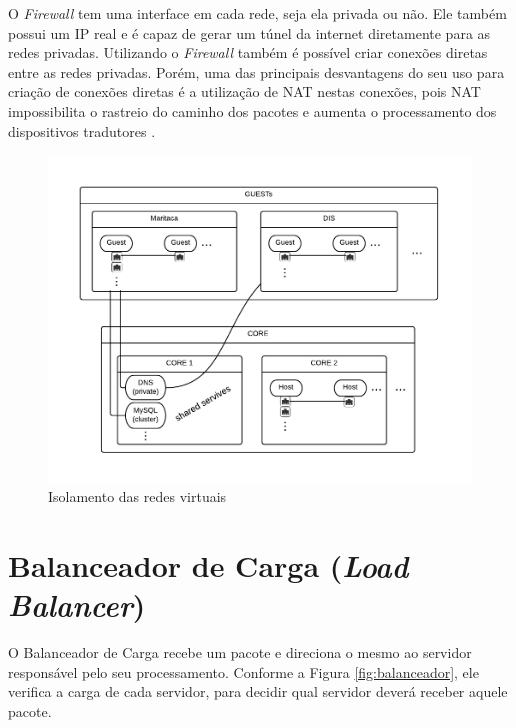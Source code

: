 O \textit{Firewall} tem uma interface em cada rede, seja ela privada ou não. Ele também possui um IP real e é capaz de gerar um túnel da internet diretamente para as redes privadas. Utilizando o \textit{Firewall} também é possível criar conexões diretas entre as redes privadas. Porém, uma das principais desvantagens do seu uso para criação de conexões diretas é a utilização de NAT nestas conexões, pois NAT impossibilita o rastreio do caminho dos pacotes e aumenta o processamento dos dispositivos tradutores \cite{mattos}. 

    \begin{figure}[htb]
    \centering
    \includegraphics[scale=0.50]{imagens/esquema2.pdf}
    \caption{Isolamento das redes virtuais}
    \label{fig:isolamento}
    \end{figure}
    
\section{Balanceador de Carga (\textit{Load Balancer})}

O Balanceador de Carga recebe um pacote e direciona o mesmo ao servidor responsável pelo seu processamento.
Conforme a Figura \ref{fig:balanceador}, ele verifica a carga de cada servidor, para decidir qual servidor deverá receber aquele pacote.

